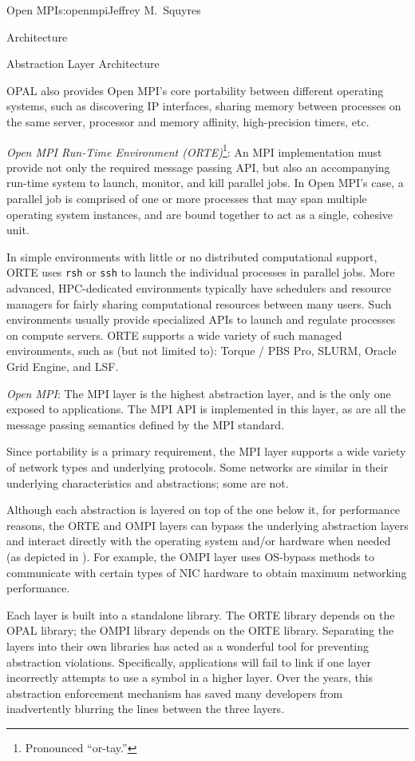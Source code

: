 \begin{aosachapter}{Open MPI}{s:openmpi}{Jeffrey M.\ Squyres}
\begin{aosasect1}{Architecture}
\begin{aosasect2}{Abstraction Layer Architecture}
\begin{aosaitemize}
  OPAL also provides Open MPI's core portability between different
  operating systems, such as discovering IP interfaces, sharing
  memory between processes on the same server, processor and memory
  affinity, high-precision timers, etc.

\item {\em Open MPI Run-Time Environment (ORTE)}\footnote{Pronounced
    ``or-tay.''}: An MPI implementation must provide not only the
  required message passing API, but also an accompanying run-time
  system to launch, monitor, and kill parallel jobs.  In Open MPI's
  case, a parallel job is comprised of one or more processes that may
  span multiple operating system instances, and are bound together to
  act as a single, cohesive unit.

  In simple environments with little or no distributed computational
  support, ORTE uses {\tt rsh} or {\tt ssh} to launch the individual
  processes in parallel jobs.  More advanced, HPC-dedicated
  environments typically have schedulers and resource managers for
  fairly sharing computational resources between many users.  Such
  environments usually provide specialized APIs to launch and regulate
  processes on compute servers.  ORTE supports a wide variety of such
  managed environments, such as (but not limited to): Torque / PBS
  Pro, SLURM, Oracle Grid Engine, and LSF.

\item {\em Open MPI}: The MPI layer is the highest abstraction layer,
  and is the only one exposed to applications.  The MPI API is
  implemented in this layer, as are all the message passing semantics
  defined by the MPI standard.

  Since portability is a primary requirement, the MPI layer supports a
  wide variety of network types and underlying protocols.  Some
  networks are similar in their underlying characteristics and
  abstractions; some are not.
\end{aosaitemize}

Although each abstraction is layered on top of the one below it, for
performance reasons, the ORTE and OMPI layers can bypass the
underlying abstraction layers and interact directly with the operating
system and/or hardware when needed (as depicted in
).  For example, the OMPI layer uses
OS-bypass methods to communicate with certain types of NIC hardware to
obtain maximum networking performance.

Each layer is built into a standalone library.  The ORTE library
depends on the OPAL library; the OMPI library depends on the ORTE
library.
%
Separating the layers into their own libraries has acted as a
wonderful tool for preventing abstraction violations.
%
Specifically, applications will fail to link if one layer incorrectly
attempts to use a symbol in a higher layer.
%
Over the years, this abstraction enforcement mechanism has saved many
developers from inadvertently blurring the lines between the three
layers.


\end{aosasect2}
\end{aosasect1}
\end{aosachapter}
